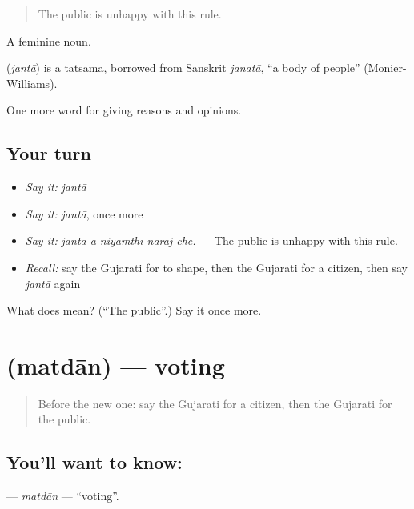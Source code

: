 \begin{quote}
The public is unhappy with this rule.
\end{quote}

A feminine noun.

\begin{cousinweb}
\textbf{} (\emph{jantā}) is a tatsama, borrowed from Sanskrit \emph{janatā}, \textquotedblleft{}a body of people\textquotedblright{} (Monier-Williams).
\end{cousinweb}

\begin{grammarlens}[title={What you've built}]
One more word for giving reasons and opinions.
\end{grammarlens}

\subsection*{Your turn}
\begin{itemize}
\raggedright
  \item \emph{Say it:} \emph{jantā}
  \item \emph{Say it:} \emph{jantā}, once more
  \item \emph{Say it:} \emph{jantā ā niyamthī nārāj che.} — The public is unhappy with this rule.
  \item \emph{Recall:} say the Gujarati for to shape, then the Gujarati for a citizen, then say \emph{jantā} again
\end{itemize}

\begin{tcolorbox}[breakable,colback=teal!4,colframe=teal!35!black,title={Before you move on}]
What does  mean? (\textquotedblleft{}The public\textquotedblright{}.) Say it once more.
\end{tcolorbox}
\section[\texorpdfstring{\gu{મતદાન} (matdān)}{મતદાન (matdān)}]{ (matdān) — voting}

\label{lesson:GU-C353-matdan}



\begin{quote}
Before the new one: say the Gujarati for a citizen, then the Gujarati for the public.
\end{quote}

\subsection*{You'll want to know: }
\textbf{} — \emph{matdān} — \textquotedblleft{}voting\textquotedblright{}.

